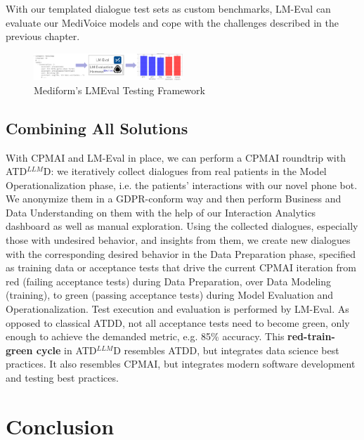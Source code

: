 \documentclass[twocolumn]{article}
\newcommand{\ATDLLMD}{ATD$^{LLM}$D}%
\begin{document}
With our templated dialogue test sets as custom benchmarks, LM-Eval can evaluate our MediVoice models and cope with the challenges described in the previous chapter.

\begin{figure}[hbt!]
  \begin{center}
\includegraphics[width=0.5\textwidth]{figures/LMEval2}
  \vspace{-8mm}
\caption{Mediform’s LMEval Testing Framework}
\label{fig:lmeval}
\end{center}
\end{figure}

\subsection{Combining All Solutions}

With CPMAI and LM-Eval in place, we can perform a CPMAI roundtrip with \ATDLLMD{}: we iteratively collect dialogues from real patients in the Model Operationalization phase, i.e. the patients’ interactions with our novel phone bot. We anonymize them in a GDPR-conform way and then perform Business and Data Understanding on them with the help of our Interaction Analytics dashboard as well as manual exploration. Using the collected dialogues, especially those with undesired behavior, and insights from them, we create new dialogues with the corresponding desired behavior in the Data Preparation phase, specified as training data or acceptance tests that drive the current CPMAI iteration from red (failing acceptance tests) during Data Preparation, over Data Modeling (training), to green (passing acceptance tests) during Model Evaluation and Operationalization. Test execution and evaluation is performed by LM-Eval. As opposed to classical ATDD, not all acceptance tests need to become green, only enough to achieve the demanded metric, e.g. 85\% accuracy. This {\bfseries red-train-green cycle} in \ATDLLMD{} resembles ATDD, but integrates data science best practices. It also resembles CPMAI, but integrates modern software development and testing best practices.


\section{Conclusion}
\end{document}
